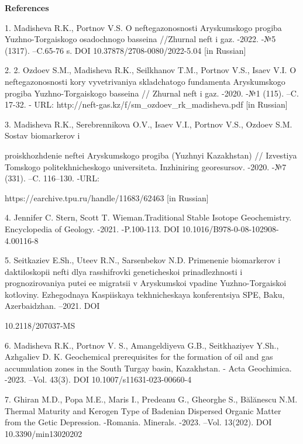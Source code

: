 \begin{center}
{\bfseries References}
\end{center}

\begin{noparindent}
1.
  Madisheva R.K., Portnov V.S. O neftegazonosnosti Aryskumskogo progiba
  Yuzhno-Torgaiskogo osadochnogo basseina //Zhurnal
  neft\textquotesingle{} i gaz. -2022. -№5 (1317). --C.65-76 s. DOI
  10.37878/2708-0080/2022-5.04 {[}in Russian{]}

2.
  2. Ozdoev S.M., Madisheva R.K., Seilkhanov T.M., Portnov V.S., Isaev
  V.I. O neftegazonosnosti kory vyvetrivaniya skladchatogo fundamenta
  Aryskumskogo progiba Yuzhno-Torgaiskogo basseina // Zhurnal
  neft\textquotesingle{} i gaz. -2020. -№1 (115). --C. 17-32. - URL:
  http://neft-gas.kz/f/sm\_ozdoev\_rk\_madisheva.pdf {[}in Russian{]}

3.
  Madisheva R.K., Serebrennikova O.V., Isaev V.I., Portnov V.S., Ozdoev
  S.M. Sostav biomarkerov i

  proiskhozhdenie neftei Aryskumskogo progiba
  (Yuzhnyi Kazakhstan) // Izvestiya Tomskogo politekhnicheskogo
  universiteta. Inzhiniring georesursov. -2020. -№7 (331). --C.
  116--130. -URL:

  https://earchive.tpu.ru/handle/11683/62463 {[}in
  Russian{]}

4.
  Jennifer C. Stern, Scott T. Wieman.Traditional Stable Isotope
  Geochemistry. Encyclopedia of Geology. -2021. -P.100-113. DOI
  10.1016/B978-0-08-102908-4.00116-8

5.
  Seitkaziev E.Sh., Uteev R.N., Sarsenbekov N.D. Primenenie biomarkerov
  i daktiloskopii nefti dlya rasshifrovki geneticheskoi prinadlezhnosti
  i prognozirovaniya putei ee migratsii v Aryskumskoi vpadine
  Yuzhno-Torgaiskoi kotloviny. Ezhegodnaya Kaspiiskaya tekhnicheskaya
  konferentsiya SPE, Baku, Azerbaidzhan. --2021. DOI

  10.2118/207037-MS

6.
  Madisheva R.K., Portnov V. S., Amangeldiyeva G.B., Seitkhaziyev Y.Sh.,
  Azhgaliev D. K. Geochemical prerequisites for the formation of oil and
  gas accumulation zones in the South Turgay basin, Kazakhstan. - Acta
  Geochimica. -2023. --Vol. 43(3). DOI 10.1007/s11631-023-00660-4

7.
  Ghiran M.D., Popa M.E., Maris I., Predeanu G., Gheorghe S., Bălănescu
  N.M. Thermal Maturity and Kerogen Type of Badenian Dispersed Organic
  Matter from the Getic Depression. -Romania. Minerals. -2023. --Vol.
  13(202). DOI 10.3390/min13020202


\end{noparindent}
